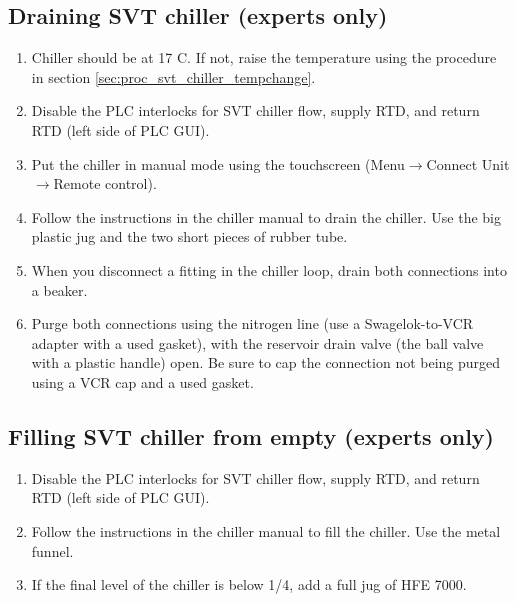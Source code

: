 \subsection{Draining SVT chiller (experts only)}
\begin{enumerate}
	\item Chiller should be at 17 C. If not, raise the temperature using the procedure in section \ref{sec:proc_svt_chiller_tempchange}.
    \item Disable the PLC interlocks for SVT chiller flow, supply RTD, and return RTD (left side of PLC GUI).
    \item Put the chiller in manual mode using the touchscreen (Menu$\to$Connect Unit$\to$Remote control).
    \item Follow the instructions in the chiller manual to drain the chiller. Use the big plastic jug and the two short pieces of rubber tube.

    \item When you disconnect a fitting in the chiller loop, drain both connections into a beaker.
    \item Purge both connections using the nitrogen line (use a Swagelok-to-VCR adapter with a used gasket), with the reservoir drain valve (the ball valve with a plastic handle) open.
        Be sure to cap the connection not being purged using a VCR cap and a used gasket. 
\end{enumerate}

\subsection{Filling SVT chiller from empty (experts only)}
\begin{enumerate}
    \item Disable the PLC interlocks for SVT chiller flow, supply RTD, and return RTD (left side of PLC GUI).
    \item Follow the instructions in the chiller manual to fill the chiller. Use the metal funnel.
    \item If the final level of the chiller is below 1/4, add a full jug of HFE 7000.
\end{enumerate}

